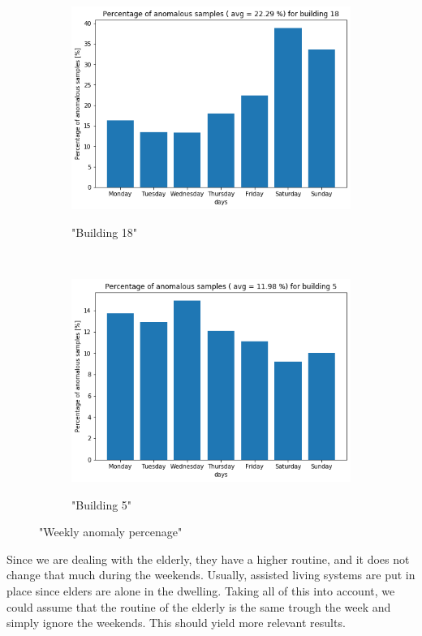 \begin{figure}[H]
    \begin{subfigure}{.5\textwidth}
		\caption{"Building 18"}
		\includegraphics[width=1\linewidth]{../Figures/EC/b18week.png}
		\label{fig:ec_b18week}
	\end{subfigure}%
    ~ 
    \begin{subfigure}{.5\textwidth}
		\caption{"Building 5"}
		\includegraphics[width=1\linewidth]{../Figures/EC/b5weekd.png}
		\label{fig:ec_b5week}
	\end{subfigure}%
	\label{fig:ec_week}
	\caption{"Weekly anomaly percenage"}
\end{figure}

Since we are dealing with the elderly, they have a higher routine, and it does not change that much during the weekends. 
Usually, assisted living systems are put in place since elders are alone in the dwelling.
Taking all of this into account, we could assume that the routine of the elderly is the same trough the week and simply ignore the weekends. 
This should yield more relevant results. 

